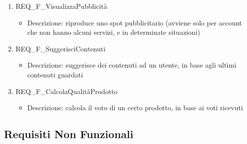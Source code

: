 \begin{enumerate}
	\item REQ\_F\_VisualizzaPubblicità
		\begin{itemize}
			\item Descrizione: riproduce uno spot pubblicitario (avviene solo per account che non hanno alcuni servizi, e in determinate situazioni)
		\end{itemize}
	
	\item REQ\_F\_SuggerisciContenuti
		\begin{itemize}	
			\item Descrizione: suggerisce dei contenuti ad un utente, in base agli ultimi contenuti guardati
		\end{itemize}
		
	\item REQ\_F\_CalcolaQualitàProdotto
		\begin{itemize}	
			\item Descrizione: calcola il voto di un certo prodotto, in base ai voti ricevuti
		\end{itemize}
	


\end{enumerate}

\subsection{Requisiti Non Funzionali}

